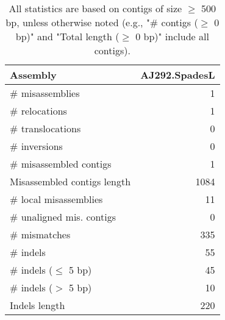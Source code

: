\documentclass[12pt,a4paper]{article}
\begin{document}
\begin{table}[ht]
\begin{center}
\caption{All statistics are based on contigs of size $\geq$ 500 bp, unless otherwise noted (e.g., "\# contigs ($\geq$ 0 bp)" and "Total length ($\geq$ 0 bp)" include all contigs).}
\begin{tabular}{|l*{1}{|r}|}
\hline
Assembly & AJ292.SpadesL \\ \hline
\# misassemblies & 1 \\ \hline
\hspace{5mm}\# relocations & 1 \\ \hline
\hspace{5mm}\# translocations & 0 \\ \hline
\hspace{5mm}\# inversions & 0 \\ \hline
\# misassembled contigs & 1 \\ \hline
Misassembled contigs length & 1084 \\ \hline
\# local misassemblies & 11 \\ \hline
\# unaligned mis. contigs & 0 \\ \hline
\# mismatches & 335 \\ \hline
\# indels & 55 \\ \hline
\hspace{5mm}\# indels ($\leq$ 5 bp) & 45 \\ \hline
\hspace{5mm}\# indels ($>$ 5 bp) & 10 \\ \hline
Indels length & 220 \\ \hline
\end{tabular}
\end{center}
\end{table}
\end{document}
